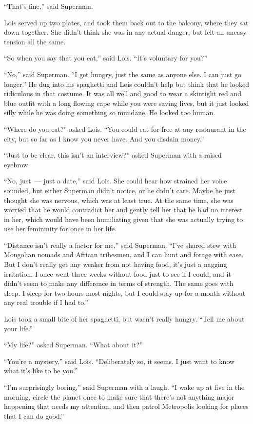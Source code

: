 \documentclass[ebook,12pt]{memoir}
\begin{document}
``That's fine,'' said Superman.

Lois served up two plates, and took them back out to the balcony, where
they sat down together. She didn't think she was in any actual danger,
but felt an uneasy tension all the same.

``So when you say that you eat,'' said Lois. ``It's voluntary for you?''

``No,'' said Superman. ``I get hungry, just the same as anyone else. I
can just go longer.'' He dug into his spaghetti and Lois couldn't help
but think that he looked ridiculous in that costume. It was all well and
good to wear a skintight red and blue outfit with a long flowing cape
while you were saving lives, but it just looked silly while he was doing
something so mundane. He looked too human.

``Where do you eat?'' asked Lois. ``You could eat for free at any
restaurant in the city, but so far as I know you never have. And you
disdain money.''

``Just to be clear, this isn't an interview?'' asked Superman with a
raised eyebrow.

``No, just~--- just a date,'' said Lois. She could hear how strained her
voice sounded, but either Superman didn't notice, or he didn't care.
Maybe he just thought she was nervous, which was at least true. At the
same time, she was worried that he would contradict her and gently tell
her that he had no interest in her, which would have been humiliating
given that she was actually trying to use her femininity for once in her
life.

``Distance isn't really a factor for me,'' said Superman. ``I've shared
stew with Mongolian nomads and African tribesmen, and I can hunt and
forage with ease. But I don't really get any weaker from not having
food, it's just a nagging irritation. I once went three weeks without
food just to see if I could, and it didn't seem to make any difference
in terms of strength. The same goes with sleep. I sleep for two hours
most nights, but I could stay up for a month without any real trouble if
I had to.''

Lois took a small bite of her spaghetti, but wasn't really hungry.
``Tell me about your life.''

``My life?'' asked Superman. ``What about it?''

``You're a mystery,'' said Lois. ``Deliberately so, it seems. I just
want to know what it's like to be you.''

``I'm surprisingly boring,'' said Superman with a laugh. ``I wake up at
five in the morning, circle the planet once to make sure that there's
not anything major happening that needs my attention, and then patrol
Metropolis looking for places that I can do good.''
\end{document}
